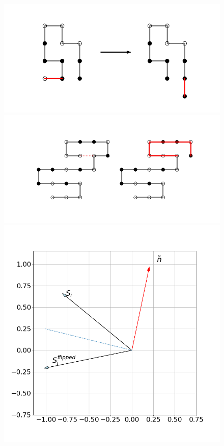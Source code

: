 \documentclass{beamer}
\begin{document}
\begin{frame}
\begin{minipage}{0.44\linewidth}
	\end{minipage}%
	\hfill
	\begin{minipage}{0.56\linewidth}
		\begin{figure}[h]
			\centering
			\includegraphics[scale=0.22]{snakeupdate.png} \\
			\includegraphics[scale=0.22]{reconnect.png} \\ 
			\includegraphics[scale=0.122]{cluster_flip.png}

\end{figure}
\end{minipage}
\end{frame}
\end{document}
